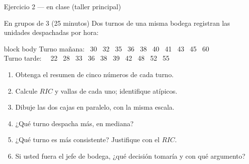 \documentclass[aspectratio=169,10pt]{beamer}
\begin{document}
\begin{frame}{Ejercicio 2 — en clase (taller principal)}
  \begin{alertblock}{En grupos de 3 (25 minutos)}
    \scriptsize
    Dos turnos de una misma bodega registran las unidades despachadas por hora:

    \vspace{0.15cm}
    \begin{beamercolorbox}[wd=0.94\textwidth,sep=0.1cm]{block body}
      \centering\scriptsize\ttfamily
      Turno mañana: \ 30 \ 32 \ 35 \ 36 \ 38 \ 40 \ 41 \ 43 \ 45 \ 60 \\
      Turno tarde: \ \ 22 \ 28 \ 33 \ 36 \ 38 \ 39 \ 42 \ 48 \ 52 \ 55
    \end{beamercolorbox}

    \vspace{0.2cm}
    \begin{enumerate}\setlength{\itemsep}{-0.07cm}
      \item Obtenga el resumen de cinco números de cada turno.
      \item Calcule $RIC$ y vallas de cada uno; identifique atípicos.
      \item Dibuje las dos cajas en paralelo, con la misma escala.
      \item ¿Qué turno despacha más, en mediana?
      \item ¿Qué turno es más consistente? Justifique con el $RIC$.
      \item Si usted fuera el jefe de bodega, ¿qué decisión tomaría y con qué
            argumento?
    \end{enumerate}
  \end{alertblock}
\end{frame}
\end{document}
